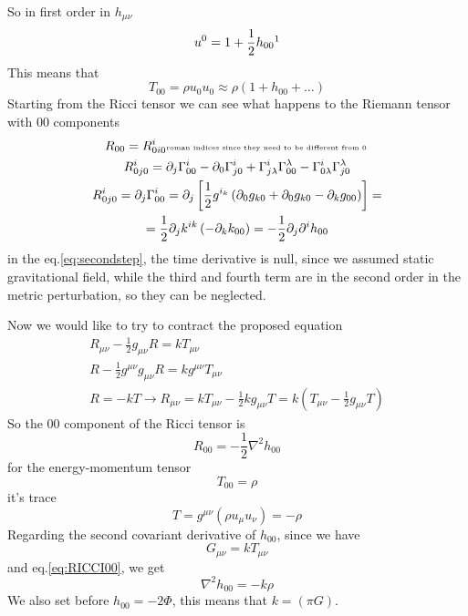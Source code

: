 So in first order in $h_{\mu \nu }$
\begin{equation}
u^{0} = 1+ \frac{1}{2}h_{00}\footnotemark
\end{equation}
This means that
\begin{equation}
T_{00} = \rho u_{0}u_{0} \approx \rho \left( 1+ h_{00} + \ldots  \right)	
\end{equation}
Starting from the Ricci tensor we can see what happens to the Riemann tensor with 00 components
\begin{gather*}
R_{00} = R^{i}_{0i0}  \text{\tiny   roman indices since they need to be different from 0 }\\
R^{i}_{0j0} = \partial_{j}\Gamma ^{i}_{00} - \partial_{0}\Gamma ^{i}_{j0} + \Gamma ^{i}_{j\lambda }\Gamma ^{\lambda }_{00} - \Gamma ^{i}_{0\lambda }\Gamma ^{\lambda }_{j0} \\
R^{i}_{0j0} = \partial_{j}\Gamma ^{i}_{00} = \partial_{j} \left[\frac{1}{2} g^{i_k} \left( \partial_{0}g_{k0}+ \partial_{0}g_{k0}- \partial_{k}g_{00} \right)\right] = \label{eq:secondstep}\\
= \frac{1}{2} \partial_{j}k^{ik} \left( -\partial_{k}k_{00} \right) = - \frac{1}{2} \partial_{j} \partial^{i}h_{00}
\end{gather*}
in the eq.\ref{eq:secondstep}, the time derivative is null, since we assumed static gravitational field, while the third and fourth term are in the second order in the metric perturbation, so they can be neglected.\par
Now we would like to try to contract the proposed equation
\begin{gather*}
R_{\mu \nu } - \frac{1}{2} g_{\mu \nu } R = k T_{\mu \nu } \\
R - \frac{1}{2} g^{\mu \nu } g_{\mu \nu }R = k g^{\mu \nu }T_{\mu \nu }\\
R = -kT
\to  R_{\mu \nu } = kT_{\mu \nu } - \frac{1}{2} kg_{\mu \nu }T = k \left( T_{\mu \nu } - \frac{1}{2} g_{\mu \nu } T \right)
\end{gather*}
So the 00 component of the Ricci tensor is 
\begin{equation}\label{eq:RICCI00}
R_{00} = -\frac{1}{2} \nabla ^{2}h_{00}
\end{equation}
for the energy-momentum tensor
\begin{equation}
T_{00} = \rho 
\end{equation}
it's trace
\begin{equation}
T = g^{\mu \nu } \left( \rho u_{\mu } u_{\nu }\right) = -\rho 
\end{equation}
Regarding the second covariant derivative of $h_{00}$, since we have
\[
	G_{\mu \nu } = k T_{\mu \nu }
\]
and eq.\ref{eq:RICCI00}, we get
\begin{equation}
\nabla ^{2}h_{00} = -k\rho 
\end{equation}
We also set before $h_{00} = -2 \Phi $, this means that $k = \left( \pi G \right)$.\par

